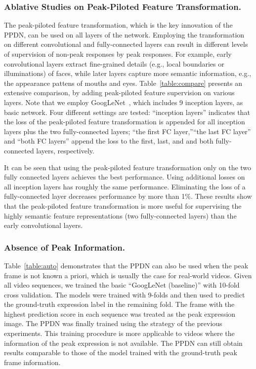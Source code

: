 \documentclass[runningheads]{llncs}
\begin{document}
\subsubsection{Ablative Studies on Peak-Piloted Feature Transformation. }
The peak-piloted feature transformation, which is the key innovation of
the PPDN,  can be used on all layers of the network. Employing the 
transformation on different convolutional and fully-connected layers can 
result in different levels of supervision of non-peak responses by 
peak responses. For example, early convolutional layers extract fine-grained 
details (e.g., local boundaries or illuminations) of faces,
while later layers capture more semantic information, e.g., the appearance 
pattens of mouths and eyes. Table~\ref{table:compare} presents
an extensive comparison, by adding peak-piloted feature supervision on 
various layers. Note that we employ GoogLeNet~\cite{szegedy2015going}, 
which includes 9 inception layers, as basic network. Four different settings 
are tested: ``inception layers'' indicates that the loss of the peak-piloted 
feature transformation is appended for all inception layers plus the two 
fully-connected layers; ``the first FC layer,''``the last FC layer'' and 
``both FC layers'' append the loss to the first, last, and and both 
fully-connected layers, respectively. 

It can be seen that using the peak-piloted feature transformation only on the
two fully connected layers achieves the best performance. Using additional 
losses on all inception layers has roughly the same performance. Eliminating 
the loss of a fully-connected layer decreases performance by more
than 1\%. These results show that the peak-piloted feature transformation 
is more useful for supervising the highly semantic feature 
representations (two fully-connected layers) than the early convolutional 
layers.  





\subsubsection{Absence of Peak Information.} Table~\ref{table:auto} 
demonstrates that the PPDN can also be used when the peak frame is not known
a priori, which is usually the case for real-world videos. Given all video 
sequences, we trained the basic ``GoogLeNet (baseline)'' with 10-fold 
cross validation. The models were trained with 9-folds and then
used to predict the ground-truth expression label in the remaining fold.
The frame with the highest prediction score in each sequence was treated as 
the peak expression image. The PPDN was finally trained using the
strategy of the previous experiments. This training procedure
is more applicable to videos where the information of the peak 
expression is not available. The PPDN can still obtain 
results comparable to those of the model trained with the ground-truth peak 
frame information.
\end{document}
